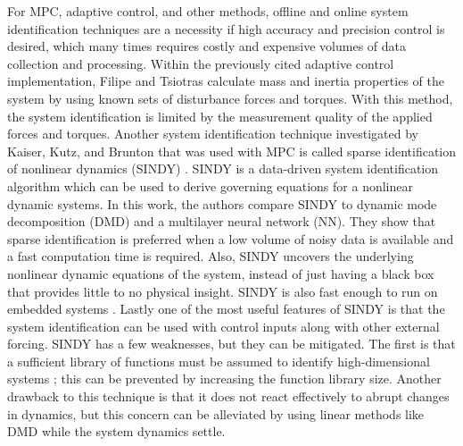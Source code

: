 \documentclass[letterpaper, preprint, paper,11pt]{AAS}	%
\begin{document}
For MPC, adaptive control, and other methods, offline and online system identification techniques are a necessity if high accuracy and precision control is desired, which many times requires costly and expensive volumes of data collection and processing. Within the previously cited adaptive control implementation, Filipe and Tsiotras calculate mass and inertia properties of the system by using known sets of disturbance forces and torques. With this method, the system identification is limited by the measurement quality of the applied forces and torques. Another system identification technique investigated by Kaiser, Kutz, and Brunton that was used with MPC is called sparse identification of nonlinear dynamics (SINDY) \cite{KaiserKutz_SINDyMPC}. SINDY is a data-driven system identification algorithm which can be used to derive governing equations for a nonlinear dynamic systems. In this work, the authors compare SINDY to dynamic mode decomposition (DMD) and a multilayer neural network (NN). They show that sparse identification is preferred when a low volume of noisy data is available and a fast computation time is required. Also, SINDY uncovers the underlying nonlinear dynamic equations of the system, instead of just having a black box that provides little to no physical insight. SINDY is also fast enough to run on embedded systems \cite{ProvostBrunton_SINDyAnalysis}. Lastly one of the most useful features of SINDY is that the system identification can be used with control inputs along with other external forcing. SINDY has a few weaknesses, but they can be mitigated. The first is that a sufficient library of functions must be assumed to identify high-dimensional systems \cite{KaiserKutz_SINDyMPC}; this can be prevented by increasing the function library size. Another drawback to this technique is that it does not react effectively to abrupt changes in dynamics, but this concern can be alleviated by using linear methods like DMD while the system dynamics settle.
\end{document}
